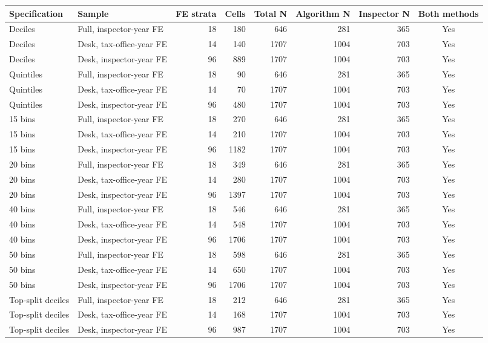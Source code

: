\begin{tabular}{llrrrrrc}
\toprule
Specification & Sample & FE strata & Cells & Total N & Algorithm N & Inspector N & Both methods \\
\midrule
Deciles & Full, inspector-year FE & 18 & 180 & 646 & 281 & 365 & Yes \\
Deciles & Desk, tax-office-year FE & 14 & 140 & 1707 & 1004 & 703 & Yes \\
Deciles & Desk, inspector-year FE & 96 & 889 & 1707 & 1004 & 703 & Yes \\
Quintiles & Full, inspector-year FE & 18 & 90 & 646 & 281 & 365 & Yes \\
Quintiles & Desk, tax-office-year FE & 14 & 70 & 1707 & 1004 & 703 & Yes \\
Quintiles & Desk, inspector-year FE & 96 & 480 & 1707 & 1004 & 703 & Yes \\
15 bins & Full, inspector-year FE & 18 & 270 & 646 & 281 & 365 & Yes \\
15 bins & Desk, tax-office-year FE & 14 & 210 & 1707 & 1004 & 703 & Yes \\
15 bins & Desk, inspector-year FE & 96 & 1182 & 1707 & 1004 & 703 & Yes \\
20 bins & Full, inspector-year FE & 18 & 349 & 646 & 281 & 365 & Yes \\
20 bins & Desk, tax-office-year FE & 14 & 280 & 1707 & 1004 & 703 & Yes \\
20 bins & Desk, inspector-year FE & 96 & 1397 & 1707 & 1004 & 703 & Yes \\
40 bins & Full, inspector-year FE & 18 & 546 & 646 & 281 & 365 & Yes \\
40 bins & Desk, tax-office-year FE & 14 & 548 & 1707 & 1004 & 703 & Yes \\
40 bins & Desk, inspector-year FE & 96 & 1706 & 1707 & 1004 & 703 & Yes \\
50 bins & Full, inspector-year FE & 18 & 598 & 646 & 281 & 365 & Yes \\
50 bins & Desk, tax-office-year FE & 14 & 650 & 1707 & 1004 & 703 & Yes \\
50 bins & Desk, inspector-year FE & 96 & 1706 & 1707 & 1004 & 703 & Yes \\
Top-split deciles & Full, inspector-year FE & 18 & 212 & 646 & 281 & 365 & Yes \\
Top-split deciles & Desk, tax-office-year FE & 14 & 168 & 1707 & 1004 & 703 & Yes \\
Top-split deciles & Desk, inspector-year FE & 96 & 987 & 1707 & 1004 & 703 & Yes \\
\bottomrule
\end{tabular}
